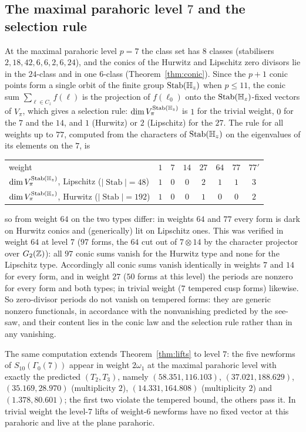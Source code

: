 \documentclass[11pt]{amsart}
\theoremstyle{definition}
\newcommand{\Stab}{\operatorname{Stab}}\newcommand{\Aut}{\operatorname{Aut}}\newcommand{\Der}{\operatorname{Der}}\renewcommand{\Im}{\operatorname{Im}}
\begin{document}
\subsection{The maximal parahoric level $7$ and the selection rule}
At the maximal parahoric level $p=7$ the class set has $8$ classes (stabilisers $2,18,42,6,6,2,6,24$), and the conics of the Hurwitz and Lipschitz zero divisors lie in the $24$-class and in one $6$-class (Theorem~\ref{thm:conic}). Since the $p+1$ conic points form a single orbit of the finite group $\Stab(\Hq_z)$ when $p\le 11$, the conic sum $\sum_{\ell\in C_z}f(\ell)$ is the projection of $f(\ell_0)$ onto the $\Stab(\Hq_z)$-fixed vectors of $V_\pi$, which gives a selection rule: $\dim V_\pi^{\Stab(\Hq_z)}$ is $1$ for the trivial weight, $0$ for the $7$ and the $14$, and $1$ (Hurwitz) or $2$ (Lipschitz) for the $27$. The rule for all weights up to $77$, computed from the characters of $\Stab(\Hq_z)$ on the eigenvalues of its elements on the $7$, is
\begin{center}\begin{tabular}{l@{\quad}ccccccc}\toprule
weight & $1$ & $7$ & $14$ & $27$ & $64$ & $77$ & $77'$\\
$\dim V_\pi^{\Stab(\Hq_z)}$, Lipschitz ($|\Stab|=48$) & $1$ & $0$ & $0$ & $2$ & $1$ & $1$ & $3$\\
$\dim V_\pi^{\Stab(\Hq_z)}$, Hurwitz ($|\Stab|=192$) & $1$ & $0$ & $0$ & $1$ & $0$ & $0$ & $2$\\\bottomrule\end{tabular}\end{center}
so from weight $64$ on the two types differ: in weights $64$ and $77$ every form is dark on Hurwitz conics and (generically) lit on Lipschitz ones. This was verified in weight $64$ at level $7$ ($97$ forms, the $64$ cut out of $7\otimes14$ by the character projector over $G_2(\mathbb{Z})$): all $97$ conic sums vanish for the Hurwitz type and none for the Lipschitz type. Accordingly all conic sums vanish identically in weights $7$ and $14$ for every form, and in weight $27$ ($50$ forms at this level) the periods are nonzero for every form and both types; in trivial weight ($7$ tempered cusp forms) likewise. So zero-divisor periods do not vanish on tempered forms: they are generic nonzero functionals, in accordance with the nonvanishing predicted by the see-saw, and their content lies in the conic law and the selection rule rather than in any vanishing.

The same computation extends Theorem~\ref{thm:lifts} to level $7$: the five newforms of $S_{10}(\Gamma_0(7))$ appear in weight $2\omega_1$ at the maximal parahoric level with exactly the predicted $(T_2,T_3)$, namely $(58.351,116.103)$, $(37.021,188.629)$, $(35.169,28.970)$ (multiplicity $2$), $(14.331,164.808)$ (multiplicity $2$) and $(1.378,80.601)$; the first two violate the tempered bound, the others pass it. In trivial weight the level-$7$ lifts of weight-$6$ newforms have no fixed vector at this parahoric and live at the plane parahoric.
\end{document}
